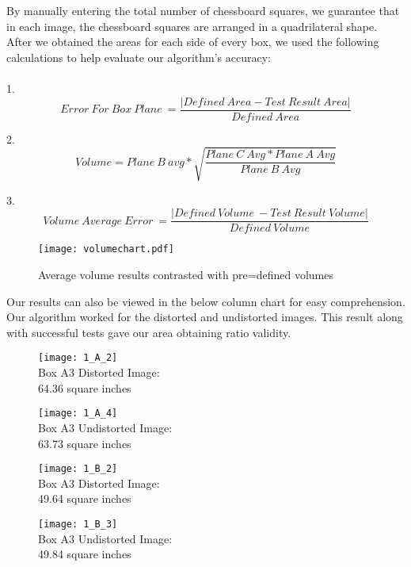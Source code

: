 \documentclass[11pt, twoside, reqno]{book}
\begin{document}
\FloatBarrier


By manually entering the total number of chessboard squares, we guarantee that in each image, the chessboard squares are arranged in a quadrilateral shape. After we obtained the areas for each side of every box, we used the following calculations to help evaluate our algorithm's accuracy:\\ \\
1. \[ Error\ For\ Box\ Plane\ = \frac{\vert Defined\ Area - Test\ Result\ Area\vert}{Defined\ Area}  \]


2. \[Volume =Plane\ B\ avg*\sqrt{\frac{Plane\ C\ Avg* Plane\ A\ Avg}{Plane\ B\ Avg}} \]

3. \[ Volume\ Average\ Error\ = \frac{\vert Defined\ Volume\ - Test\ Result\ Volume\vert}{Defined\ Volume}  \]

\begin{figure} [H]


\begin{center}
	 \graphicspath{ {images/} }
	 \texttt{[image: volumechart.pdf]}
%	
	\caption{Average volume results contrasted with pre=defined volumes}

\end{center}
\end{figure}

 
 Our results can also be viewed in the below column chart for easy comprehension. Our algorithm worked for the distorted and undistorted images. This result along with successful tests gave our area obtaining ratio validity. 
  \FloatBarrier

  
  \begin{figure}
  	\centering
  	\begin{minipage}{.5\textwidth}
  		\centering
  		\texttt{[image: 1\_A\_2]}
  		\\Box A3 Distorted Image: \\64.36 square inches 	
  	\end{minipage}%
  	\begin{minipage}{.5\textwidth}
  		\centering
  		\texttt{[image: 1\_A\_4]}
  		\\Box A3 Undistorted Image:\\ 63.73 square inches
  	\end{minipage}
  \end{figure}


 \begin{figure}
	\centering
	\begin{minipage}{.5\textwidth}
		\centering
		\texttt{[image: 1\_B\_2]}
		\\Box A3 Distorted Image: \\49.64 square inches 	
	\end{minipage}%
	\begin{minipage}{.5\textwidth}
		\centering
		\texttt{[image: 1\_B\_3]}
		\\Box A3 Undistorted Image:\\ 49.84 square inches
	\end{minipage}
\end{figure}
\end{document}
